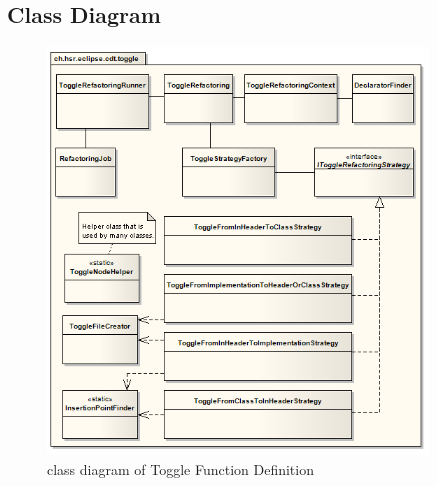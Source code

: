 \subsection{Class Diagram}
\begin{figure}[h]
  \centering
  \includegraphics[width=0.9\textwidth]{images/class_diagram.png}
  \caption{class diagram of Toggle Function Definition}
  \label{classdiagram}
\end{figure}

